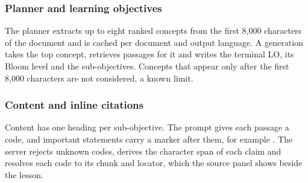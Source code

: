 \subsubsection{Planner and learning objectives}
The planner extracts up to eight ranked concepts from the first 8,000 characters of the document and is cached per document and output language. A generation takes the top concept, retrieves passages for it and writes the terminal LO, its Bloom level and the sub-objectives. Concepts that appear only after the first 8,000 characters are not considered, a known limit.
\subsubsection{Content and inline citations}
Content has one heading per sub-objective. The prompt gives each passage a code, and important statements carry a marker after them, for example . The server rejects unknown codes, derives the character span of each claim and resolves each code to its chunk and locator, which the source panel shows beside the lesson.
\needspace{.55\textheight}
